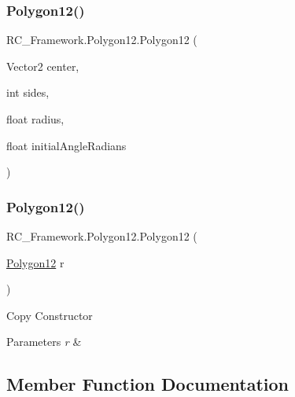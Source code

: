 \subsubsection{\texorpdfstring{Polygon12()}{Polygon12()}\hspace{0.1cm}{\footnotesize\ttfamily [4/5]}}
{\footnotesize\ttfamily R\+C\+\_\+\+Framework.\+Polygon12.\+Polygon12 (\begin{DoxyParamCaption}\item[{Vector2}]{center,  }\item[{int}]{sides,  }\item[{float}]{radius,  }\item[{float}]{initial\+Angle\+Radians }\end{DoxyParamCaption})}

\mbox{\label{class_r_c___framework_1_1_polygon12_a9ac9fba6dd81e8c7a83dc3ccd9a799da}} 
\subsubsection{\texorpdfstring{Polygon12()}{Polygon12()}\hspace{0.1cm}{\footnotesize\ttfamily [5/5]}}
{\footnotesize\ttfamily R\+C\+\_\+\+Framework.\+Polygon12.\+Polygon12 (\begin{DoxyParamCaption}\item[{\mbox{\hyperlink{class_r_c___framework_1_1_polygon12}{Polygon12}}}]{r }\end{DoxyParamCaption})}



Copy Constructor 


\begin{DoxyParams}{Parameters}
{\em r} & \\
\hline
\end{DoxyParams}


\subsection{Member Function Documentation}
\mbox{\label{class_r_c___framework_1_1_polygon12_a4a4389b28bd9d598da3a35221b16ec6c}} 
